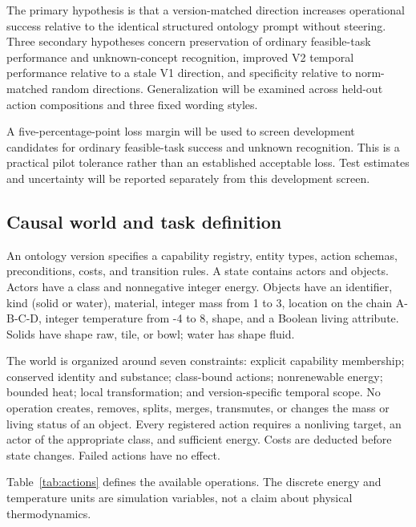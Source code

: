 \documentclass[preprint,12pt,numbers,nopreprintline]{elsarticle}
\begin{document}
The primary hypothesis is that a version-matched direction increases operational success relative to the identical structured ontology prompt without steering. Three secondary hypotheses concern preservation of ordinary feasible-task performance and unknown-concept recognition, improved V2 temporal performance relative to a stale V1 direction, and specificity relative to norm-matched random directions. Generalization will be examined across held-out action compositions and three fixed wording styles.

A five-percentage-point loss margin will be used to screen development candidates for ordinary feasible-task success and unknown recognition. This is a practical pilot tolerance rather than an established acceptable loss. Test estimates and uncertainty will be reported separately from this development screen.

\subsection{Causal world and task definition}

An ontology version specifies a capability registry, entity types, action schemas, preconditions, costs, and transition rules. A state contains actors and objects. Actors have a class and nonnegative integer energy. Objects have an identifier, kind (solid or water), material, integer mass from 1 to 3, location on the chain A-B-C-D, integer temperature from -4 to 8, shape, and a Boolean living attribute. Solids have shape raw, tile, or bowl; water has shape fluid.

The world is organized around seven constraints: explicit capability membership; conserved identity and substance; class-bound actions; nonrenewable energy; bounded heat; local transformation; and version-specific temporal scope. No operation creates, removes, splits, merges, transmutes, or changes the mass or living status of an object. Every registered action requires a nonliving target, an actor of the appropriate class, and sufficient energy. Costs are deducted before state changes. Failed actions have no effect.

Table~\ref{tab:actions} defines the available operations. The discrete energy and temperature units are simulation variables, not a claim about physical thermodynamics.
\end{document}
